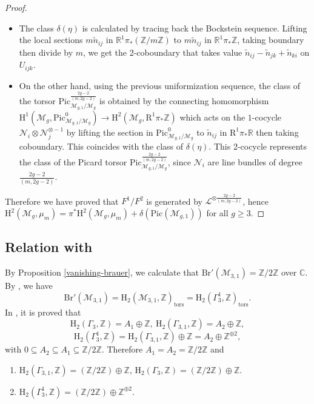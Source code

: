 \documentclass[12pt]{amsart}
\begin{document}
\begin{proof}
\begin{itemize}
\item The class $\delta(\eta)$ is calculated by tracing back the Bockstein sequence. Lifting the local sections $m\widetilde{n}_{ij}$ in $\mathbb{R}^1\pi_*(\mathbb{Z}/m\mathbb{Z})$ to $m\widetilde{n}_{ij}$ in $\mathbb{R}^1\pi_*\mathbb{Z}$, taking boundary then divide by $m$, we get the 2-coboundary that takes value $\widetilde{n}_{ij}-\widetilde{n}_{jk}+\widetilde{n}_{ki}$ on $U_{ijk}$.
\item On the other hand, using the previous uniformization sequence, the class of the torsor $\mathrm{Pic}^{\frac{2g-2}{(m,2g-2)}}_{\mathcal{M}_{g,1}/\mathcal{M}_g}$
 is obtained by the connecting homomorphism $\mathrm{H}^1(\mathcal{M}_g,\mathrm{Pic}^0_{\mathcal{M}_{g,1}/\mathcal{M}_g})\to\mathrm{H}^2(\mathcal{M}_g,\mathrm{R}^1\pi_*\mathbb{Z})$ which acts on the $1$-cocycle $\mathcal{N}_{i}\otimes\mathcal{N}_j^{\otimes-1}$ by lifting the section in $\mathrm{Pic}^0_{\mathcal{M}_{g,1}/\mathcal{M}_g}$ to $\widetilde{n}_{ij}$ in $\mathrm{R}^1\pi_*\mathbb{R}$ then taking coboundary. This coincides with the class of $\delta(\eta)$. This 2-cocycle represents the class of the Picard torsor $\mathrm{Pic}^{\frac{2g-2}{(m,2g-2)}}_{\mathcal{M}_{g,1}/\mathcal{M}_g}$, since $\mathcal{N}_i$ are line bundles of degree $\frac{2g-2}{(m,2g-2)}$.
\end{itemize}
Therefore we have proved that $F^1/F^2$ is generated by $\mathcal{L}^{\otimes\frac{2g-2}{(m,2g-2)}}$, hence $\mathrm{H}^2(\mathcal{M}_g,\mu_m)=\pi^*\mathrm{H}^2(\mathcal{M}_{g},\mu_m)+\delta(\mathrm{Pic}(\mathcal{M}_{g,1}))$ for all $g\geq3$.
\end{proof}

\subsection{Relation with \cite[Theorem 1.2]{zbMATH01991000}}
By Proposition \ref{vanishing-brauer}, we calculate that $\mathrm{Br}'(\mathcal{M}_{3,1})=\mathbb{Z}/2\mathbb{Z}$ over $\mathbb{C}$. By \cite[Proposition 4.1]{zbMATH07456405}, we have $$\mathrm{Br}'(\mathcal{M}_{3,1})=\mathrm{H}_2(\mathcal{M}_{3,1},\mathbb{Z})_{\mathrm{tors}}=\mathrm{H}_2(\Gamma_3^1,\mathbb{Z})_{\textrm{tors}}.$$ In \cite[Theorem 1.2, Proposition 1.4]{zbMATH01991000}, it is proved that $$\mathrm{H}_2(\Gamma_3,\mathbb{Z})=A_1\oplus\mathbb{Z},\ \mathrm{H}_2(\Gamma_{3,1},\mathbb{Z})=A_2\oplus\mathbb{Z},$$ $$\mathrm{H}_2(\Gamma_3^1,\mathbb{Z})=\mathrm{H}_2(\Gamma_{3,1},\mathbb{Z})\oplus\mathbb{Z}=A_2\oplus\mathbb{Z}^{\oplus2},$$ with $0\subseteq A_2\subseteq A_1\subseteq \mathbb{Z}/2\mathbb{Z}$. Therefore $A_1=A_2=\mathbb{Z}/2\mathbb{Z}$ and \begin{enumerate}
\item $\mathrm{H}_2(\Gamma_{3,1},\mathbb{Z})=(\mathbb{Z}/2\mathbb{Z})\oplus \mathbb{Z}$, $\mathrm{H}_2(\Gamma_3,\mathbb{Z})=( \mathbb{Z}/2\mathbb{Z})\oplus \mathbb{Z}$. \item $\mathrm{H}_2(\Gamma_3^1,\mathbb{Z})=(\mathbb{Z}/2\mathbb{Z})\oplus\mathbb{Z}^{\oplus2}.$
\end{enumerate}
\end{document}
